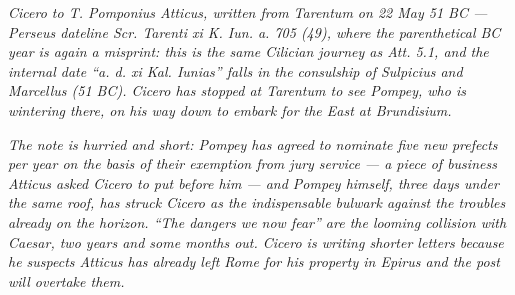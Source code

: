 
\textit{Cicero to T. Pomponius Atticus, written from Tarentum
on 22 May 51 BC --- Perseus dateline \textit{Scr. Tarenti xi K.
Iun. a. 705 (49)}, where the parenthetical BC year is again a
misprint: this is the same Cilician journey as Att. 5.1, and the
internal date ``a. d. xi Kal. Iunias'' falls in the consulship
of Sulpicius and Marcellus (51 BC). Cicero has stopped at
Tarentum to see Pompey, who is wintering there, on his way down
to embark for the East at Brundisium.}

\textit{The note is hurried and short: Pompey has agreed to
nominate five new prefects per year on the basis of their
exemption from jury service --- a piece of business Atticus
asked Cicero to put before him --- and Pompey himself, three
days under the same roof, has struck Cicero as the indispensable
bulwark against the troubles already on the horizon. ``The
dangers we now fear'' are the looming collision with Caesar, two
years and some months out. Cicero is writing shorter letters
because he suspects Atticus has already left Rome for his
property in Epirus and the post will overtake them.}
